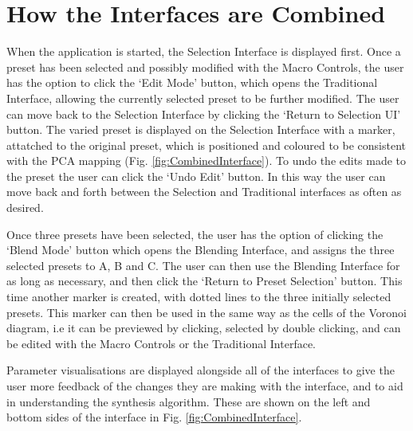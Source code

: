 \documentclass[11pt, oneside]{report}   	%
\begin{document}
\section{How the Interfaces are Combined}
When the application is started, the Selection Interface is displayed first. Once a preset has been selected and possibly modified with the Macro Controls, the user has the option to click the `Edit Mode' button, which opens the Traditional Interface, allowing the currently selected preset to be further modified. The user can move back to the Selection Interface by clicking the `Return to Selection UI' button. The varied preset is displayed on the Selection Interface with a marker, attatched to the original preset, which is positioned and coloured to be consistent with the PCA mapping (Fig. \ref{fig:CombinedInterface}). To undo the edits made to the preset the user can click the `Undo Edit' button. In this way the user can move back and forth between the Selection and Traditional interfaces as often as desired.

Once three presets have been selected, the user has the option of clicking the `Blend Mode' button which opens the Blending Interface, and assigns the three selected presets to A, B and C. The user can then use the Blending Interface for as long as necessary, and then click the `Return to Preset Selection' button. This time another marker is created, with dotted lines to the three initially selected presets. 
This marker can then be used in the same way as the cells of the Voronoi diagram, i.e it can be previewed by clicking, selected by double clicking, and can be edited with the Macro Controls or the Traditional Interface.

 Parameter visualisations are displayed alongside all of the interfaces to give the user more feedback of the changes they are making with the interface, and to aid in understanding the synthesis algorithm. These are shown on the left and bottom sides of the interface in Fig. \ref{fig:CombinedInterface}.
 
\end{document}
